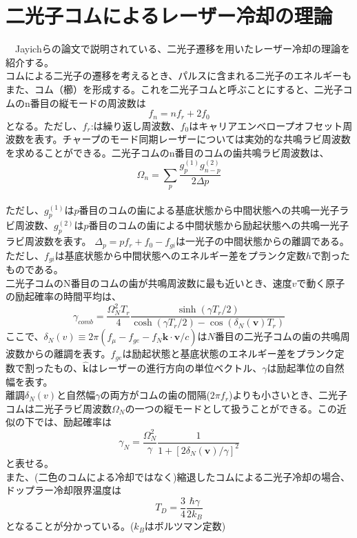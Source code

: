 \documentclass[uplatex,dvipdfmx,a4paper,report,papersize,11pt]{jsbook}
\begin{document}
\section{二光子コムによるレーザー冷却の理論}
　Jayichらの論文\cite{PhysRevX.6.041004}で説明されている、二光子遷移を用いたレーザー冷却の理論を紹介する。\\
コムによる二光子の遷移を考えるとき、パルスに含まれる二光子のエネルギーもまた、コム（櫛）を形成する。これを二光子コムと呼ぶことにすると、二光子コムのn番目の縦モードの周波数は
\begin{equation}
f_n = nf_r + 2f_0
\end{equation}
となる。ただし、$f_r$:は繰り返し周波数、$f_0$はキャリアエンベロープオフセット周波数を表す。チャープのモード同期レーザーについては実効的な共鳴ラビ周波数を求めることができる。二光子コムのn番目のコムの歯共鳴ラビ周波数は、
\begin{equation}
\Omega _{n}=\sum _{p}\frac {g^{\left( 1\right) }_{p}g^{\left( 2\right) }_{n-p}}{2\Delta p}
\end{equation}\\
ただし、$g^{\left( 1\right) }_{p}$は$p$番目のコムの歯による基底状態から中間状態への共鳴一光子ラビ周波数、$g^{\left( 2\right) }_{p}$は$p$番目のコムの歯による中間状態から励起状態への共鳴一光子ラビ周波数を表す。
$\Delta _{p}=pf_{r}+f_{0}-f_{gi}$は一光子の中間状態からの離調である。ただし、$f_{gi}$は基底状態から中間状態へのエネルギー差をプランク定数$h$で割ったものである。\\
二光子コムのN番目のコムの歯が共鳴周波数に最も近いとき、速度$v$で動く原子の励起確率の時間平均は、
\begin{equation}
\gamma_{comb} = \frac{\Omega^2_{N}T_r} {4} \frac{\sinh(\gamma T_r/2)}{\cosh(\gamma T_r/2) - \cos(\delta_N(\bm{v})T_r)}
\end{equation}
ここで、$\delta _{N}\left( v\right) \equiv 2\pi ( f_{\mu }-f_{ge}-f_{N}\widehat {\bm{k}}\cdot {\bm{v}}/c )$は$N$番目の二光子コムの歯の共鳴周波数からの離調を表す。$f_{ge}$は励起状態と基底状態のエネルギー差をプランク定数で割ったもの、$\widehat {\bm{k}}$はレーザーの進行方向の単位ベクトル、$\gamma$は励起準位の自然幅を表す。\\
離調$\delta _{N}\left( v\right)$と自然幅$\gamma$の両方がコムの歯の間隔($2\pi f_r$)よりも小さいとき、二光子コムは二光子ラビ周波数$\Omega_N$の一つの縦モードとして扱うことができる。この近似の下では、励起確率は
\begin{equation}
\gamma_N = \frac{\Omega^2_N}{\gamma}\frac{1}{1 + [2\delta_N(\bm{v})/\gamma]^2}
\end{equation}
と表せる。\\
 また、(二色のコムによる冷却ではなく)縮退したコムによる二光子冷却の場合、ドップラー冷却限界温度は
\begin{equation}
  T_D = \frac{3}{4}\frac{\hbar\gamma}{2k_B}
\end{equation}
となることが分かっている。($k_B$はボルツマン定数)
\end{document}
